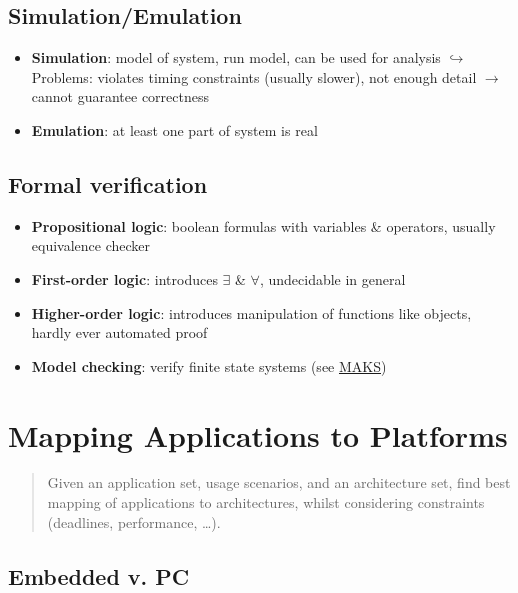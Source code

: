 \documentclass{article}
\begin{document}
\subsection{Simulation/Emulation}
\begin{itemize}
  \item \textbf{Simulation}: model of system, run model, can be used for analysis
        $\hookrightarrow$ Problems: violates timing constraints (usually slower), not enough detail $\to$ cannot guarantee correctness
  \item \textbf{Emulation}: at least one part of system is real
\end{itemize}

\subsection{Formal verification}
\begin{itemize}
  \item \textbf{Propositional logic}: boolean formulas with variables \& operators, usually equivalence checker
  \item \textbf{First-order logic}: introduces $\exists$ \& $\forall$, undecidable in general
  \item \textbf{Higher-order logic}: introduces manipulation of functions like objects, hardly ever automated proof
  \item \textbf{Model checking}: verify finite state systems (see \href{https://github.com/Leo-Lem/winter23/tree/main/MAKS}{MAKS})
\end{itemize}



\section{Mapping Applications to Platforms}
\begin{quote}Given an application set, usage scenarios, and an architecture set, find best mapping of applications to architectures, whilst considering constraints (deadlines, performance, …).\end{quote}

\subsection{Embedded v. PC}

\end{document}
